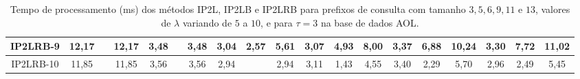 \begin{table}[h]
{\begin{tabular}{c|c|c|c|c|c|c|c|c|c|c|c|c|c|c|c|c|c|c|}
\multicolumn{1}{|c|}{IP2LRB-9} & {\color[HTML]{656565} 12,17} & {\color[HTML]{656565} } & 12,17 & {\color[HTML]{656565} 3,48} & {\color[HTML]{656565} } & 3,48 & {\color[HTML]{656565} 3,04} & {\color[HTML]{656565} 2,57} & 5,61 & {\color[HTML]{656565} 3,07} & {\color[HTML]{656565} 4,93} & 8,00 & {\color[HTML]{656565} 3,37} & {\color[HTML]{656565} 6,88} & 10,24 & {\color[HTML]{656565} 3,30} & {\color[HTML]{656565} 7,72} & 11,02 \\ \hline
\multicolumn{1}{|c|}{IP2LRB-10} & {\color[HTML]{656565} 11,85} & {\color[HTML]{656565} } & 11,85 & {\color[HTML]{656565} 3,56} & {\color[HTML]{656565} } & 3,56 & {\color[HTML]{656565} 2,94} & {\color[HTML]{656565} } & 2,94 & {\color[HTML]{656565} 3,11} & {\color[HTML]{656565} 1,43} & 4,55 & {\color[HTML]{656565} 3,40} & {\color[HTML]{656565} 2,29} & 5,70 & {\color[HTML]{656565} 2,96} & {\color[HTML]{656565} 2,49} & 5,45 \\ \hline
\end{tabular}%
}
\caption{Tempo de processamento (ms) dos métodos IP2L, IP2LB e IP2LRB para prefixos de consulta com tamanho $3,5,6,9,11$ e $13$, valores de $\lambda$ variando de $5$ a $10$, e para $\tau=3$ na base de dados AOL.}
\label{tab:methods-processing-time-tau-3-AOL}
\end{table}

